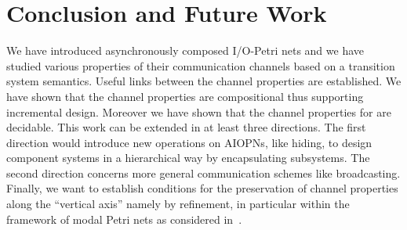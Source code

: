\section{Conclusion and Future Work}
\label{sec:conclusion}

We have introduced asynchronously composed I/O-Petri nets and we have
studied various properties of their communication channels based on a transition system semantics.
Useful links between the channel properties are established. We have shown that the channel properties are compositional
thus supporting incremental design. Moreover we have shown that the channel properties for \AIOPNs are decidable. 
This work can be extended in at least three directions. The first direction 
would introduce new operations on AIOPNs, like hiding, to design component systems
in a hierarchical way by encapsulating subsystems.
The second direction concerns more general communication schemes like broadcasting.
Finally, we want to establish conditions for the
preservation of channel properties along the ``vertical axis'' namely by refinement,
in particular within the framework of modal Petri nets as considered in~\cite{EHH12}.

